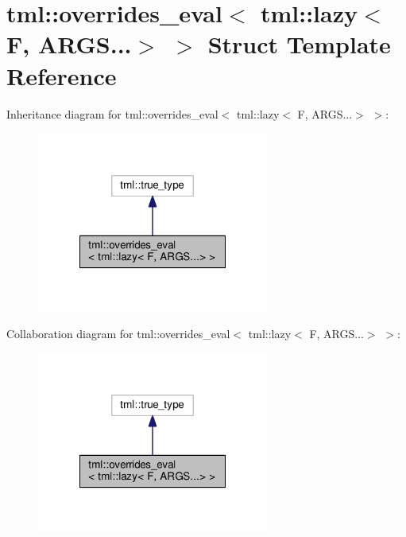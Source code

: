 \hypertarget{structtml_1_1overrides__eval_3_01tml_1_1lazy_3_01_f_00_01_a_r_g_s_8_8_8_4_01_4}{\section{tml\+:\+:overrides\+\_\+eval$<$ tml\+:\+:lazy$<$ F, A\+R\+G\+S...$>$ $>$ Struct Template Reference}
\label{structtml_1_1overrides__eval_3_01tml_1_1lazy_3_01_f_00_01_a_r_g_s_8_8_8_4_01_4}
}


Inheritance diagram for tml\+:\+:overrides\+\_\+eval$<$ tml\+:\+:lazy$<$ F, A\+R\+G\+S...$>$ $>$\+:
\nopagebreak
\begin{figure}[H]
\begin{center}
\leavevmode
\includegraphics[width=216pt]{structtml_1_1overrides__eval_3_01tml_1_1lazy_3_01_f_00_01_a_r_g_s_8_8_8_4_01_4__inherit__graph}
\end{center}
\end{figure}


Collaboration diagram for tml\+:\+:overrides\+\_\+eval$<$ tml\+:\+:lazy$<$ F, A\+R\+G\+S...$>$ $>$\+:
\nopagebreak
\begin{figure}[H]
\begin{center}
\leavevmode
\includegraphics[width=216pt]{structtml_1_1overrides__eval_3_01tml_1_1lazy_3_01_f_00_01_a_r_g_s_8_8_8_4_01_4__coll__graph}
\end{center}
\end{figure}


